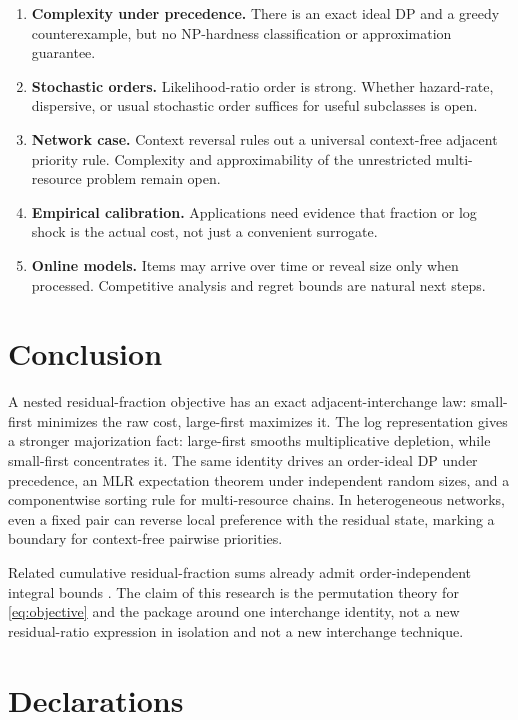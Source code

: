 \documentclass[pdflatex,iicol,sn-basic]{sn-jnl}
\theoremstyle{thmstyleone}
\theoremstyle{thmstyletwo}
\theoremstyle{thmstylethree}
\begin{document}
\begin{enumerate}[leftmargin=2em]
\item \textbf{Complexity under precedence.} There is an exact ideal DP and a
greedy counterexample, but no NP-hardness classification or approximation
guarantee.
\item \textbf{Stochastic orders.} Likelihood-ratio order is strong.
Whether hazard-rate, dispersive, or usual stochastic order suffices for useful
subclasses is open.
\item \textbf{Network case.} Context reversal rules out a universal
context-free adjacent priority rule. Complexity and approximability of the
unrestricted multi-resource problem remain open.
\item \textbf{Empirical calibration.} Applications need evidence that fraction or
log shock is the actual cost, not just a convenient surrogate.
\item \textbf{Online models.} Items may arrive over time or reveal size only when
processed. Competitive analysis and regret bounds are natural next steps.
\end{enumerate}

\section{Conclusion}
\label{sec:conclusion}

A nested residual-fraction objective has an exact adjacent-interchange law:
small-first minimizes the raw cost, large-first maximizes it. The log
representation gives a stronger majorization fact: large-first smooths
multiplicative depletion, while small-first concentrates it. The same identity
drives an order-ideal DP under precedence, an MLR expectation theorem under
independent random sizes, and a componentwise sorting rule for multi-resource
chains. In heterogeneous networks, even a fixed pair can reverse local
preference with the residual state, marking a boundary for context-free
pairwise priorities.

Related cumulative residual-fraction sums already admit order-independent
integral bounds \citep{Pain2026}. The claim of this research is the permutation
theory for \eqref{eq:objective} and the package around one interchange identity,
not a new residual-ratio expression in isolation and not a new interchange
technique.

\section*{Declarations}
\end{document}
